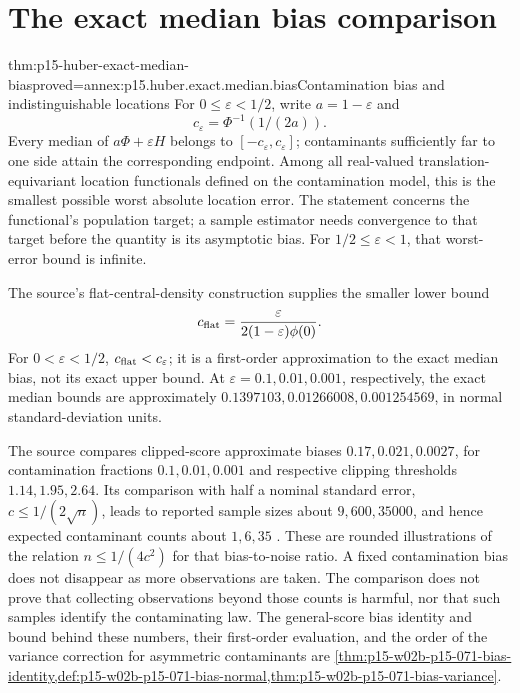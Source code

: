 \section{The exact median bias comparison}
\label{sec:p15-huber-median-bias}

\begin{hbtheorem}{thm:p15-huber-exact-median-bias}{proved=annex:p15.huber.exact.median.bias}{Contamination bias and indistinguishable locations}
For \(0\leq\varepsilon<1/2\), write \(a=1-\varepsilon\) and
\[
                       c_\varepsilon=\Phi^{-1}(1/(2a)).
\]
Every median of \(a\Phi+\varepsilon H\) belongs to
\([-c_\varepsilon,c_\varepsilon]\); contaminants sufficiently far
to one side attain the corresponding endpoint.
Among all real-valued translation-equivariant location functionals
defined on the contamination model, this is the smallest possible
worst absolute location error. The statement concerns the functional's
population target; a sample estimator needs convergence to that
target before the quantity is its asymptotic bias.
For \(1/2\leq\varepsilon<1\), that worst-error bound is infinite.

The source's flat-central-density construction supplies the smaller
lower bound
\[
 c_{\rm flat}=\frac{\varepsilon}{2(1-\varepsilon)\phi(0)}.
\]
For \(0<\varepsilon<1/2\), \(c_{\rm flat}<c_\varepsilon\);
it is a first-order approximation to the exact median bias, not
its exact upper bound. At \(\varepsilon=0.1,0.01,0.001\), respectively,
the exact median bounds are approximately
\(0.1397103,0.01266008,0.001254569\), in normal standard-deviation units.
\end{hbtheorem}

The source compares clipped-score approximate biases
\(0.17,0.021,0.0027\), for contamination fractions
\(0.1,0.01,0.001\) and respective clipping thresholds
\(1.14,1.95,2.64\). Its comparison with half a nominal standard error,
\(c\leq1/(2\sqrt n)\), leads to reported sample sizes about
\(9,600,35000\), and hence expected contaminant counts about
\(1,6,35\) \cite[pp.~83, 86]{Huber1964RobustLocation}.
These are rounded illustrations of the relation
\(n\leq1/(4c^2)\) for that bias-to-noise ratio. A fixed contamination
bias does not disappear as more observations are taken. The comparison
does not prove that collecting observations beyond those counts is
harmful, nor that such samples identify the contaminating law.
The general-score bias identity and bound behind these numbers,
their first-order evaluation, and the order of the variance correction
for asymmetric contaminants are
\cref{thm:p15-w02b-p15-071-bias-identity,def:p15-w02b-p15-071-bias-normal,thm:p15-w02b-p15-071-bias-variance}.

